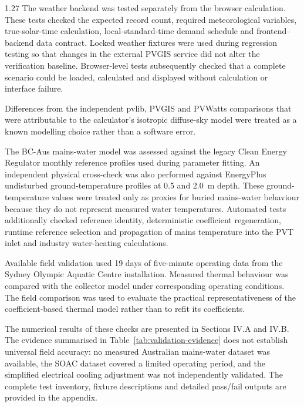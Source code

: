 \documentclass[12pt,letterpaper]{article}
\begin{document}
\begin{spacing}{1.27}
The weather backend was tested separately from the browser calculation. These tests checked the expected record count, required meteorological variables, true-solar-time calculation, local-standard-time demand schedule and frontend--backend data contract. Locked weather fixtures were used during regression testing so that changes in the external PVGIS service did not alter the verification baseline. Browser-level tests subsequently checked that a complete scenario could be loaded, calculated and displayed without calculation or interface failure.\par

\vspace{0.15in}

Differences from the independent pvlib, PVGIS and PVWatts comparisons that were attributable to the calculator's isotropic diffuse-sky model were treated as a known modelling choice rather than a software error.\par

\vspace{0.15in}

The BC-Aus mains-water model was assessed against the legacy Clean Energy Regulator monthly reference profiles used during parameter fitting. An independent physical cross-check was also performed against EnergyPlus undisturbed ground-temperature profiles at 0.5 and 2.0~m depth. These ground-temperature values were treated only as proxies for buried mains-water behaviour because they do not represent measured water temperatures. Automated tests additionally checked reference identity, deterministic coefficient regeneration, runtime reference selection and propagation of mains temperature into the PVT inlet and industry water-heating calculations.\par

\vspace{0.15in}

Available field validation used 19 days of five-minute operating data from the Sydney Olympic Aquatic Centre installation. Measured thermal behaviour was compared with the collector model under corresponding operating conditions. The field comparison was used to evaluate the practical representativeness of the coefficient-based thermal model rather than to refit its coefficients.\par

\vspace{0.15in}

The numerical results of these checks are presented in Sections IV.A and IV.B. The evidence summarised in Table~\ref{tab:validation-evidence} does not establish universal field accuracy: no measured Australian mains-water dataset was available, the SOAC dataset covered a limited operating period, and the simplified electrical cooling adjustment was not independently validated. The complete test inventory, fixture descriptions and detailed pass/fail outputs are provided in the appendix.\par
\end{spacing}
\end{document}
